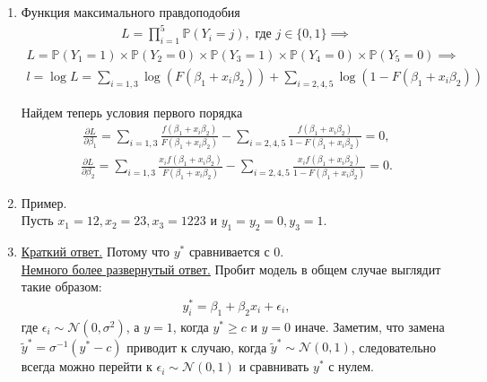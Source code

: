 \documentclass[12pt, a4paper]{article}\usepackage[]{graphicx}\usepackage[]{color}
\begin{document}
\begin{enumerate}

\item Функция максимального правдоподобия
\begin{eqnarray}
L = \prod_{i=1}^5 \mathbb{P}(Y_i = j), \text{ где } j \in \{0,1\} \implies
\end{eqnarray}
\begin{eqnarray}
L = \mathbb{P}(Y_1 = 1) \times \mathbb{P}(Y_2 = 0) \times \mathbb{P}(Y_3 = 1) \times \mathbb{P}(Y_4 = 0) \times \mathbb{P}(Y_5 = 0) \implies
\end{eqnarray}
\begin{eqnarray}
l = \log L = \sum_{i=1,3} \log(F(\beta_1 + x_i \beta_2)) + \sum_{i = 2,4,5} \log(1 - F(\beta_1 + x_i \beta_2))
\end{eqnarray}

Найдем теперь условия первого порядка
\begin{eqnarray}
\frac {\partial L}{\partial \beta_1} = \sum_{i=1,3} \frac{f(\beta_1 + x_i\beta_2)}{F(\beta_1 + x_i \beta_2)} - \sum_{i=2,4,5} \frac { f(\beta_1 + x_i\beta_2)}{1 - F(\beta_1 + x_i \beta_2)} = 0,
\end{eqnarray}
\begin{eqnarray}
\frac {\partial L}{\partial \beta_2} = \sum_{i=1,3} \frac{x_i f(\beta_1 + x_i\beta_2)}{F(\beta_1 + x_i \beta_2)} - \sum_{i=2,4,5} \frac {x_i f(\beta_1 + x_i\beta_2)}{1 - F(\beta_1 + x_i \beta_2)} = 0.
\end{eqnarray}

\item
Пример. \\
Пусть $x_1 = 12, x_2 = 23, x_3 = 1223$ и $y_1 = y_2 = 0, y_3 = 1$.

\item
\underline{Краткий ответ.} Потому что $y^*$ сравнивается с 0. \\
\underline{Немного более развернутый ответ.} Пробит модель в общем случае выглядит такие образом:
\begin{eqnarray}
y^*_i = \beta_1 + \beta_2 x_i + \epsilon_i,
\end{eqnarray}
где $\epsilon_i \sim \mathcal{N}(0, \sigma^2)$, а $y = 1$, когда $y^* \ge c$ и $y = 0$ иначе. Заметим, что замена $\tilde y^* = \sigma^{-1} (y^* - c)$ приводит к случаю, когда $\tilde y^* \sim \mathcal{N}(0, 1)$, следовательно всегда можно перейти к $\epsilon_i \sim \mathcal{N}(0, 1)$ и сравнивать $y^*$ с нулем.


\end{enumerate}
\end{document}
